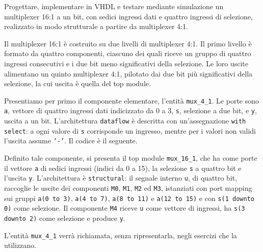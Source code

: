 \label{sec:esercizio1-1}

\begin{traccia}
Progettare, implementare in VHDL e testare mediante simulazione un multiplexer 16:1 a un bit, con sedici ingressi dati e quattro ingressi di selezione, realizzato in modo strutturale a partire da multiplexer 4:1.
\end{traccia}

\progetto

Il multiplexer 16:1 è costruito su due livelli di multiplexer 4:1. Il primo livello è formato da quattro componenti, ciascuno dei quali riceve un gruppo di quattro ingressi consecutivi e i due bit meno significativi della selezione. Le loro uscite alimentano un quinto multiplexer 4:1, pilotato dai due bit più significativi della selezione, la cui uscita è quella del top module.


\implementazione

Presentiamo per primo il componente elementare, l'entità \texttt{mux\_4\_1}. Le porte sono \texttt{a}, vettore di quattro ingressi dati indicizzato da 0 a 3, \texttt{s}, selezione a due bit, e \texttt{y}, uscita a un bit. L'architettura \texttt{dataflow} è descritta con un'assegnazione \texttt{with select}: a ogni valore di \texttt{s} corrisponde un ingresso, mentre per i valori non validi l'uscita assume \texttt{'-'}. Il codice è il seguente.


Definito tale componente, si presenta il top module \texttt{mux\_16\_1}, che ha come porte il vettore \texttt{a} di sedici ingressi (indici da 0 a 15), la selezione \texttt{s} a quattro bit e l'uscita \texttt{y}. L'architettura è \texttt{structural}: il segnale interno \texttt{u}, di quattro bit, raccoglie le uscite dei componenti \texttt{M0}, \texttt{M1}, \texttt{M2} ed \texttt{M3}, istanziati con port mapping sui gruppi \texttt{a(0 to 3)}, \texttt{a(4 to 7)}, \texttt{a(8 to 11)} e \texttt{a(12 to 15)} e con \texttt{s(1 downto 0)} come selezione. Il componente \texttt{M4} riceve \texttt{u} come vettore di ingressi, ha \texttt{s(3 downto 2)} come selezione e produce \texttt{y}.


L'entità \texttt{mux\_4\_1} verrà richiamata, senza ripresentarla, negli esercizi che la utilizzano.

